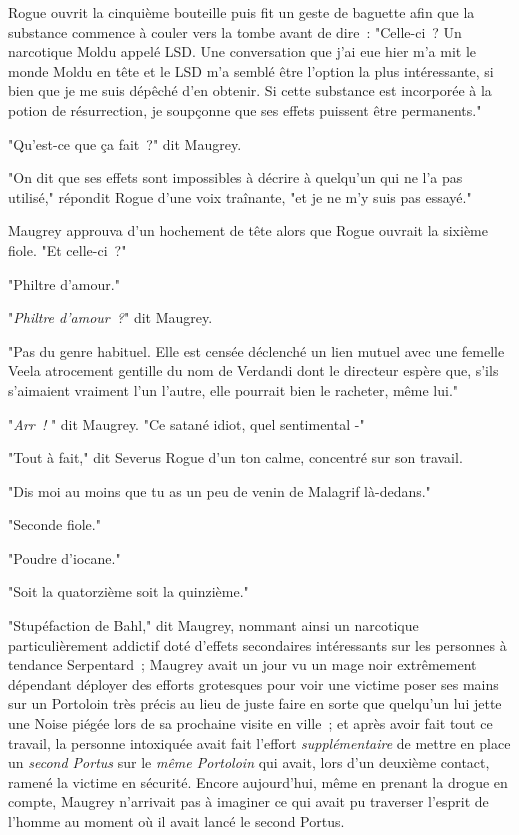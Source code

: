Rogue ouvrit la cinquième bouteille puis fit un geste de baguette afin que la substance commence à couler vers la tombe avant de dire~: "Celle-ci~? Un narcotique Moldu appelé LSD. Une conversation que j'ai eue hier m'a mit le monde Moldu en tête et le LSD m'a semblé être l'option la plus intéressante, si bien que je me suis dépêché d'en obtenir. Si cette substance est incorporée à la potion de résurrection, je soupçonne que ses effets puissent être permanents."

"Qu'est-ce que ça fait~?" dit Maugrey.

"On dit que ses effets sont impossibles à décrire à quelqu'un qui ne l'a pas utilisé," répondit Rogue d'une voix traînante, "et je ne m'y suis pas essayé."

Maugrey approuva d'un hochement de tête alors que Rogue ouvrait la sixième fiole. "Et celle-ci~?"

"Philtre d'amour."

"\emph{Philtre d'amour~?}" dit Maugrey.

"Pas du genre habituel. Elle est censée déclenché un lien mutuel avec une femelle Veela atrocement gentille du nom de Verdandi dont le directeur espère que, s'ils s'aimaient vraiment l'un l'autre, elle pourrait bien le racheter, même lui."

"\emph{Arr~!} " dit Maugrey. "Ce satané idiot, quel sentimental -"

"Tout à fait," dit Severus Rogue d'un ton calme, concentré sur son travail.

"Dis moi au moins que tu as un peu de venin de Malagrif là-dedans."

"Seconde fiole."

"Poudre d'iocane."

"Soit la quatorzième soit la quinzième."

"Stupéfaction de Bahl," dit Maugrey, nommant ainsi un narcotique particulièrement addictif doté d'effets secondaires intéressants sur les personnes à tendance Serpentard~; Maugrey avait un jour vu un mage noir extrêmement dépendant déployer des efforts grotesques pour voir une victime poser ses mains sur un Portoloin très précis au lieu de juste faire en sorte que quelqu'un lui jette une Noise piégée lors de sa prochaine visite en ville~; et après avoir fait tout ce travail, la personne intoxiquée avait fait l'effort \emph{supplémentaire} de mettre en place un \emph{second Portus} sur le \emph{même Portoloin} qui avait, lors d'un deuxième contact, ramené la victime en sécurité. Encore aujourd'hui, même en prenant la drogue en compte, Maugrey n'arrivait pas à imaginer ce qui avait pu traverser l'esprit de l'homme au moment où il avait lancé le second Portus.

